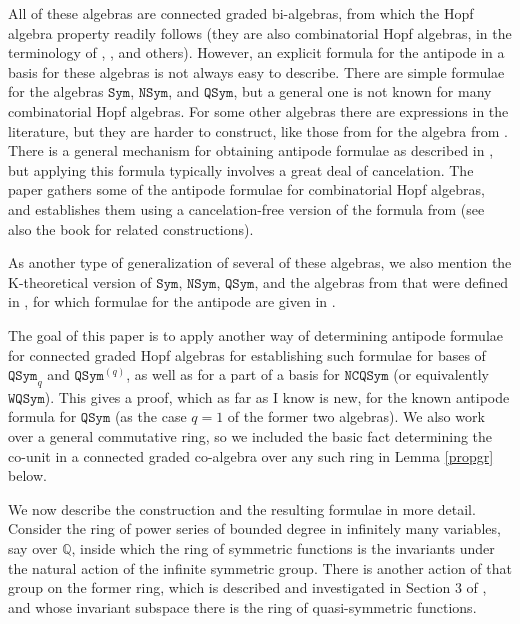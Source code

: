 \documentclass{article}
\theoremstyle{definition}
\begin{document}
All of these algebras are connected graded bi-algebras, from which the Hopf algebra property readily follows (they are also combinatorial Hopf algebras, in the terminology of \cite{[ABS]}, \cite{[BHRZ]}, and others). However, an explicit formula for the antipode in a basis for these algebras is not always easy to describe. There are simple formulae for the algebras $\mathtt{Sym}$, $\mathtt{NSym}$, and $\mathtt{QSym}$, but a general one is not known for many combinatorial Hopf algebras. For some other algebras there are expressions in the literature, but they are harder to construct, like those from \cite{[AgS]} for the algebra from \cite{[MR]}. There is a general mechanism for obtaining antipode formulae as described in \cite{[T]}, but applying this formula typically involves a great deal of cancelation. The paper \cite{[BS]} gathers some of the antipode formulae for combinatorial Hopf algebras, and establishes them using a cancelation-free version of the formula from \cite{[T]} (see also the book \cite{[AgM]} for related constructions).

As another type of generalization of several of these algebras, we also mention the K-theoretical version of $\mathtt{Sym}$, $\mathtt{NSym}$, $\mathtt{QSym}$, and the algebras from \cite{[MR]} that were defined in \cite{[LP]}, for which formulae for the antipode are given in \cite{[P]}.

The goal of this paper is to apply another way of determining antipode formulae for connected graded Hopf algebras for establishing such formulae for bases of $\mathtt{QSym}_{q}$ and $\mathtt{QSym}^{(q)}$, as well as for a part of a basis for $\mathtt{NCQSym}$ (or equivalently $\mathtt{WQSym}$). This gives a proof, which as far as I know is new, for the known antipode formula for $\mathtt{QSym}$ (as the case $q=1$ of the former two algebras). We also work over a general commutative ring, so we included the basic fact determining the co-unit in a connected graded co-algebra over any such ring in Lemma \ref{propgr} below.

\medskip

We now describe the construction and the resulting formulae in more detail. Consider the ring of power series of bounded degree in infinitely many variables, say over $\mathbb{Q}$, inside which the ring of symmetric functions is the invariants under the natural action of the infinite symmetric group. There is another action of that group on the former ring, which is described and investigated in Section 3 of \cite{[Hi2]}, and whose invariant subspace there is the ring of quasi-symmetric functions.
\end{document}
